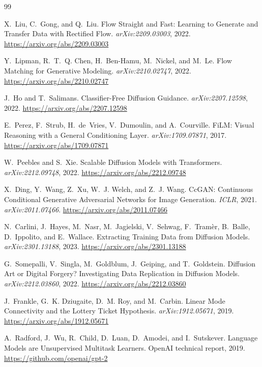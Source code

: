 \begin{thebibliography}{99}

X.~Liu, C.~Gong, and Q.~Liu.
\newblock Flow Straight and Fast: Learning to Generate and Transfer Data with
  Rectified Flow.
\newblock \emph{arXiv:2209.03003}, 2022.
  \url{https://arxiv.org/abs/2209.03003}

Y.~Lipman, R.~T.~Q. Chen, H.~Ben-Hamu, M.~Nickel, and M.~Le.
\newblock Flow Matching for Generative Modeling.
\newblock \emph{arXiv:2210.02747}, 2022.
  \url{https://arxiv.org/abs/2210.02747}

J.~Ho and T.~Salimans.
\newblock Classifier-Free Diffusion Guidance.
\newblock \emph{arXiv:2207.12598}, 2022.
  \url{https://arxiv.org/abs/2207.12598}

E.~Perez, F.~Strub, H.~de~Vries, V.~Dumoulin, and A.~Courville.
\newblock FiLM: Visual Reasoning with a General Conditioning Layer.
\newblock \emph{arXiv:1709.07871}, 2017.
  \url{https://arxiv.org/abs/1709.07871}

W.~Peebles and S.~Xie.
\newblock Scalable Diffusion Models with Transformers.
\newblock \emph{arXiv:2212.09748}, 2022.
  \url{https://arxiv.org/abs/2212.09748}

X.~Ding, Y.~Wang, Z.~Xu, W.~J. Welch, and Z.~J. Wang.
\newblock CcGAN: Continuous Conditional Generative Adversarial Networks for Image
  Generation.
\newblock \emph{ICLR}, 2021. \emph{arXiv:2011.07466}.
  \url{https://arxiv.org/abs/2011.07466}

N.~Carlini, J.~Hayes, M.~Nasr, M.~Jagielski, V.~Sehwag, F.~Tram\`er, B.~Balle,
  D.~Ippolito, and E.~Wallace.
\newblock Extracting Training Data from Diffusion Models.
\newblock \emph{arXiv:2301.13188}, 2023.
  \url{https://arxiv.org/abs/2301.13188}

G.~Somepalli, V.~Singla, M.~Goldblum, J.~Geiping, and T.~Goldstein.
\newblock Diffusion Art or Digital Forgery? Investigating Data Replication in
  Diffusion Models.
\newblock \emph{arXiv:2212.03860}, 2022.
  \url{https://arxiv.org/abs/2212.03860}

J.~Frankle, G.~K. Dziugaite, D.~M. Roy, and M.~Carbin.
\newblock Linear Mode Connectivity and the Lottery Ticket Hypothesis.
\newblock \emph{arXiv:1912.05671}, 2019.
  \url{https://arxiv.org/abs/1912.05671}

A.~Radford, J.~Wu, R.~Child, D.~Luan, D.~Amodei, and I.~Sutskever.
\newblock Language Models are Unsupervised Multitask Learners.
\newblock OpenAI technical report, 2019.
  \url{https://github.com/openai/gpt-2}

\end{thebibliography}

% 
